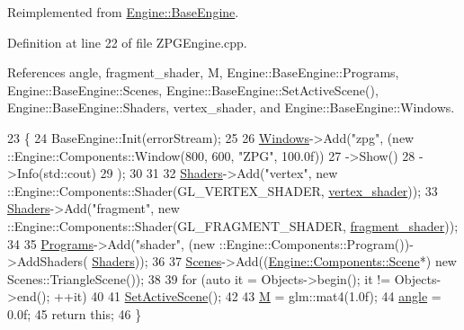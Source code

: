 Reimplemented from \mbox{\hyperlink{classEngine_1_1BaseEngine_ad9c141fe48c8c91e14e77ed5fcb90196}{Engine\+::\+Base\+Engine}}.



Definition at line 22 of file Z\+P\+G\+Engine.\+cpp.



References angle, fragment\+\_\+shader, M, Engine\+::\+Base\+Engine\+::\+Programs, Engine\+::\+Base\+Engine\+::\+Scenes, Engine\+::\+Base\+Engine\+::\+Set\+Active\+Scene(), Engine\+::\+Base\+Engine\+::\+Shaders, vertex\+\_\+shader, and Engine\+::\+Base\+Engine\+::\+Windows.


\begin{DoxyCode}
23 \{
24     BaseEngine::Init(errorStream);
25 
26     \mbox{\hyperlink{classEngine_1_1BaseEngine_a4a1a4c4dae052e66ecc4f326eeed4d33}{Windows}}->Add(\textcolor{stringliteral}{"zpg"}, (new ::Engine::Components::Window(800, 600, \textcolor{stringliteral}{"ZPG"}, 100.0f))
27         ->Show()
28         ->Info(std::cout)
29     );
30 
31 
32     \mbox{\hyperlink{classEngine_1_1BaseEngine_a2582dee3f73da82bb422b43317b85e3b}{Shaders}}->Add(\textcolor{stringliteral}{"vertex"}, new ::Engine::Components::Shader(GL\_VERTEX\_SHADER, 
      \mbox{\hyperlink{ZPGEngine_8cpp_afc33b8912f9f93d1d2544df04ad4a81a}{vertex\_shader}}));
33     \mbox{\hyperlink{classEngine_1_1BaseEngine_a2582dee3f73da82bb422b43317b85e3b}{Shaders}}->Add(\textcolor{stringliteral}{"fragment"}, new ::Engine::Components::Shader(GL\_FRAGMENT\_SHADER, 
      \mbox{\hyperlink{ZPGEngine_8cpp_ab187f2ba2a2f72ea5571921a1a856582}{fragment\_shader}}));
34 
35     \mbox{\hyperlink{classEngine_1_1BaseEngine_ae0f86360ea3a384caefe443dd8f88601}{Programs}}->Add(\textcolor{stringliteral}{"shader"}, (new ::Engine::Components::Program())->AddShaders(
      \mbox{\hyperlink{classEngine_1_1BaseEngine_a2582dee3f73da82bb422b43317b85e3b}{Shaders}}));
36 
37     \mbox{\hyperlink{classEngine_1_1BaseEngine_afd02af3c2fbe9bb734db014dec06585a}{Scenes}}->Add((\mbox{\hyperlink{classEngine_1_1Components_1_1Scene}{Engine::Components::Scene}}*) \textcolor{keyword}{new} Scenes::TriangleScene());
38 
39     \textcolor{keywordflow}{for} (\textcolor{keyword}{auto} it = Objects->begin(); it != Objects->end(); ++it)
40 
41     \mbox{\hyperlink{classEngine_1_1BaseEngine_afc82c6a00d5a9d4714740fc5eab5db86}{SetActiveScene}}();
42 
43     \mbox{\hyperlink{classApplication_1_1Engines_1_1ZPGEngine_a6e982d6b97e8d538cdf8df9a7f4c6cd0}{M}} = glm::mat4(1.0f);
44     \mbox{\hyperlink{classApplication_1_1Engines_1_1ZPGEngine_adee8aa02ea2c15751eb6222bded1f729}{angle}} = 0.0f;
45     \textcolor{keywordflow}{return} \textcolor{keyword}{this};
46 \}
\end{DoxyCode}
